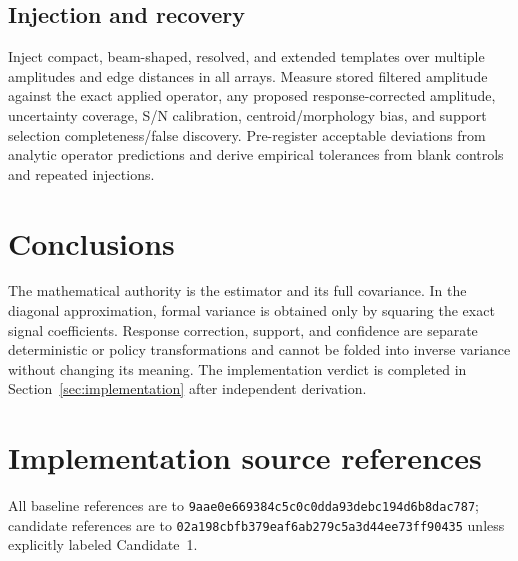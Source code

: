 \documentclass[11pt]{article}
\newcommand{\code}[1]{\nolinkurl{#1}}
\begin{document}
\subsection{Injection and recovery}
Inject compact, beam-shaped, resolved, and extended templates over multiple
amplitudes and edge distances in all arrays.  Measure stored filtered amplitude
against the exact applied operator, any proposed response-corrected amplitude,
uncertainty coverage, S/N calibration, centroid/morphology bias, and support
selection completeness/false discovery.  Pre-register acceptable deviations
from analytic operator predictions and derive empirical tolerances from blank
controls and repeated injections.

\section{Conclusions}
\label{sec:conclusions}

The mathematical authority is the estimator and its full covariance.  In the
diagonal approximation, formal variance is obtained only by squaring the exact
signal coefficients.  Response correction, support, and confidence are
separate deterministic or policy transformations and cannot be folded into
inverse variance without changing its meaning.  The implementation verdict is
completed in Section~\ref{sec:implementation} after independent derivation.

\appendix
\section{Implementation source references}
\label{app:sources}

All baseline references are to
\code{9aae0e669384c5c0c0dda93debc194d6b8dac787}; candidate references are to
\code{02a198cbfb379eaf6ab279c5a3d44ee73ff90435} unless explicitly labeled
Candidate~1.
\end{document}
